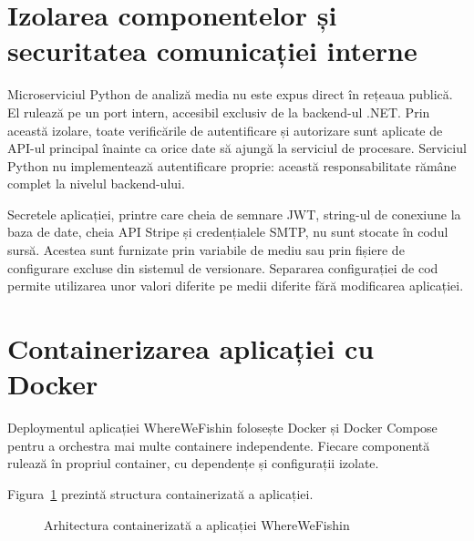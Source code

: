 \section{Izolarea componentelor și securitatea comunicației interne}

Microserviciul Python de analiză media nu este expus direct în rețeaua publică. El rulează pe un port intern, accesibil exclusiv de la backend-ul .NET. Prin această izolare, toate verificările de autentificare și autorizare sunt aplicate de API-ul principal înainte ca orice date să ajungă la serviciul de procesare. Serviciul Python nu implementează autentificare proprie: această responsabilitate rămâne complet la nivelul backend-ului.

Secretele aplicației, printre care cheia de semnare JWT, string-ul de conexiune la baza de date, cheia API Stripe și credențialele SMTP, nu sunt stocate în codul sursă. Acestea sunt furnizate prin variabile de mediu sau prin fișiere de configurare excluse din sistemul de versionare. Separarea configurației de cod permite utilizarea unor valori diferite pe medii diferite fără modificarea aplicației.

\section{Containerizarea aplicației cu Docker}

Deploymentul aplicației WhereWeFishin folosește Docker \citep{docker} și Docker Compose pentru a orchestra mai multe containere independente. Fiecare componentă rulează în propriul container, cu dependențe și configurații izolate.

Figura~\ref{fig:docker-arhitectura} prezintă structura containerizată a aplicației.

\begin{figure}[htbp]
\centering
{}
\caption{Arhitectura containerizată a aplicației WhereWeFishin}
\label{fig:docker-arhitectura}
\end{figure}

